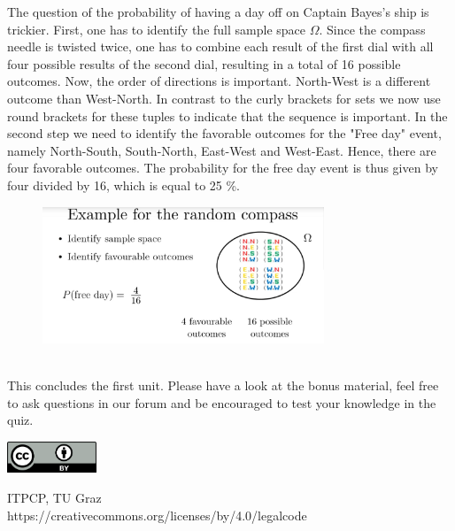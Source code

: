 \documentclass[12pt, a4paper]{scrartcl}
\begin{document}
The question of the probability of having a day off on Captain Bayes’s ship is trickier. First, one has to identify the full sample space $\Omega$. Since the compass needle is twisted twice, one has to combine each result of the first dial with all four possible results of the second dial, resulting in a total of 16 possible outcomes.
Now, the order of directions is important. North-West is a different outcome than West-North. In contrast to the curly brackets for sets we now use round brackets for these tuples to indicate that the sequence is important.
In the second step we need to identify the favorable outcomes for the "Free day" event, namely North-South, South-North, East-West and West-East. Hence, there are four favorable outcomes.
The probability for the free day event is thus given by four divided by 16, which is equal to 25 \%.\\
\begin{figure}[H]
	\centering
	\includegraphics[width=0.75\textwidth]{1_6.png}
\end{figure}
\\

This concludes the first unit. Please have a look at the bonus material, feel free to ask questions in our forum and be encouraged to test your knowledge in the quiz.\\

\vspace{2cm}
\begin{minipage}[t]{1\textwidth}
	\raggedleft
	\centering
	\includegraphics[width = 0.20\textwidth]{CC-BY_icon}
	\vspace{0.2cm}
	
	\centering
	{\large ITPCP, TU Graz} \\
	https://creativecommons.org/licenses/by/4.0/legalcode
\end{minipage}
\end{document}
